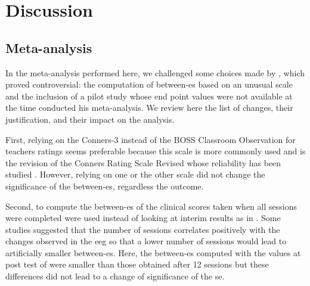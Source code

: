 


\section{Discussion}

\subsection{Meta-analysis} 

In the meta-analysis performed here, we challenged some choices made by \citeauthor{Cortese2016}, which proved controversial: 
the computation of between-\gls{es} based on an unusual scale \citep{Steiner2014} and the inclusion of a pilot study \citep{Arnold2014} 
whose end point values were not available at the time \citeauthor{Cortese2016} conducted his meta-analysis. We review here the 
list of changes, their justification, and their impact on the analysis.
 
First, relying on the Conners-3 \citep{Conners2011} instead of the BOSS Classroom Observation \citep{Shapiro2010} for
teachers ratings seems preferable because this scale is more commonly used \citep{Christiansen2014, Bluschke2016} and is
the revision of the Conners Rating Scale Revised \citep{Conners1998} whose reliability has been studied \citep{Collett2003}. 
However, relying on one or the other scale did not change the significance of the between-\gls{es}, regardless the outcome.

Second, to compute the between-\gls{es} of \citet{Arnold2014} the clinical scores taken when all sessions were completed were 
used instead of looking at interim results as in \citeauthor{Cortese2016}. Some studies suggested that the number of sessions 
correlates positively with the changes observed in the \gls{eeg} \citep{Vernon2004} so that a lower number of sessions would 
lead to artificially smaller between-\gls{es}. Here, the between-\gls{es} computed with the values at post test of \citet{Arnold2014} were smaller 
than those obtained after 12 sessions but these differences did not lead to a change of significance of the \gls{se}. 

